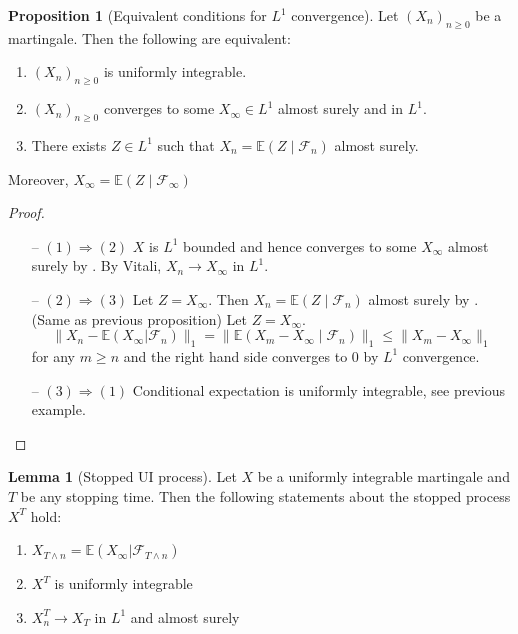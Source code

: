 \documentclass[parskip=full]{article}
\theoremstyle{definition}
\newtheorem{proposition}{Proposition}[section]
\newtheorem{lemma}{Lemma}[proposition]
\newcommand{\1}{\mathbbm{1}}
\newcommand{\E}{\mathbb{E}}
\begin{document}
\begin{proposition}[Equivalent conditions for $L^1$ convergence] \label{Equivalent conditions for L1 convergence}
  Let $(X_n)_{n \geq 0}$ be a martingale. Then the following are equivalent:
  \begin{enumerate}
    \item $(X_n)_{n \geq 0}$ is uniformly integrable.
    \item $(X_n)_{n \geq 0}$ converges to some $X_\infty \in L^1$ almost surely and in $L^1$.
    \item There exists $Z \in L^1$ such that $X_n = \E(Z \mid \mathcal{F}_n)$ almost surely.
  \end{enumerate}
  Moreover, $X_\infty = \E(Z \mid \mathcal{F}_\infty)$
\end{proposition}

\begin{proof}
  \begin{itemize}
    \item [--] $(1) \Rightarrow (2)$ $X$ is $L^1$ bounded and hence converges to some $X_\infty$ almost surely by . By Vitali, $X_n \to X_\infty$ in $L^1$.
    \item [--] $(2) \Rightarrow (3)$ Let $Z = X_\infty$. Then $X_n = \E(Z \mid \mathcal{F}_n)$ almost surely by .
     (Same as previous proposition) Let $Z = X_\infty$. 
    \[
      \|X_n - \E (X_\infty | \mathcal{F}_n)\|_1 = \|\E(X_m - X_\infty \mid \mathcal{F}_n)\|_1 \leq \|X_m - X_\infty\|_1
    \]
    for any $m \geq n$ and the right hand side converges to $0$ by $L^1$ convergence.
    \item [--] $(3) \Rightarrow (1)$ Conditional expectation is uniformly integrable, see previous example.
  \end{itemize}
\end{proof}

\begin{lemma}[Stopped UI process] \label{Stopped UI process}
  Let $X$ be a uniformly integrable martingale and $T$ be any stopping time. Then the following statements about the stopped process $X^T$ hold:
  \begin{enumerate}
    \item $X_{T \wedge n} = \E (X_\infty | \mathcal{F}_{T \wedge n})$
    \item $X^T$ is uniformly integrable
    \item $X^T_n \to X_T$ in $L^1$ and almost surely
  \end{enumerate}
\end{lemma}
\end{document}
